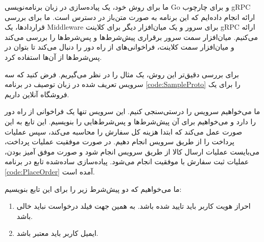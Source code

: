 ما برای روش خود، یک پیاده‌سازی در زبان برنامه‌نویسی
Go
و برای چارچوب
gRPC
ارائه انجام داده‌ایم که این برنامه به صورت متن‌باز
\cite{grpcGoContracts}
در دسترس است. ما برای بررسی قراردادها، یک
\gls{Middleware}
برای سرور و یک میان‌افزار دیگر برای کلاینت gRPC ارائه می‌کنیم. میان‌افزار سمت سرور برقراری پیش‌شرط‌ها و پس‌شرط‌ها را بررسی می‌کند و میان‌افزار سمت کلاینت، فراخوانی‌های از راه‌ دور را دنبال می‌کند تا بتوان در پس‌شرط‌ها از آن‌ها استفاده کرد.

برای بررسی دقیق‌تر این روش، یک مثال را در نظر می‌گیریم. فرض کنید که سه سرویس تعریف شده در زبان توصیف 
در برنامه 
\ref{code:SampleProto}
را برای یک فروشگاه آنلاین داریم.

\singlespacing
\begin{figure}
	\begin{LTR}
		
	\end{LTR}
\end{figure}
\doublespacing

ما می‌خواهیم سرویس 
را درستی‌سنجی کنیم. این سرویس تنها یک فراخوانی از راه‌ دور
را دارد و می‌خواهیم برای آن پیش‌شرط‌ها و پس‌شرط‌هایی را بنویسیم. این تابع به این صورت عمل می‌کند که ابتدا هزینه کل سفارش را محاسبه می‌کند، سپس عملیات پرداخت را از طریق سرویس
انجام دهیم. در صورت موفقیت عملیات پرداخت، می‌بایست عملیات ارسال کالا از طریق سرویس
انجام شود و صورت موفق آمیز بودن، عملیات ثبت سفارش با موفقیت انجام می‌شود. پیاده‌سازی ساده‌شده تابع
در برنامه
\ref{code:PlaceOrder}
آمده است.

\singlespacing
\begin{figure}
	\begin{LTR}
		
	\end{LTR}
\end{figure}
\doublespacing


ما می‌خواهیم که دو پیش‌شرط زیر را برای این تابع بنویسیم:

\begin{enumerate}
\item
احراز هویت کاربر باید تایید شده باشد. به همین جهت فیلد
درخواست نباید خالی باشد.

\item
ایمیل کاربر باید معتبر باشد.
\end{enumerate}


